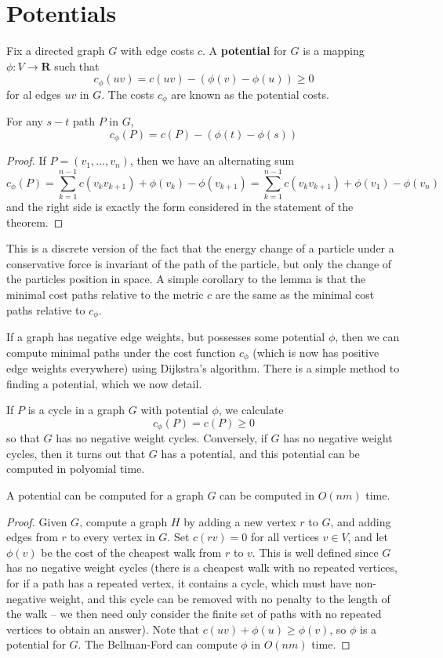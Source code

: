 \section{Potentials}

Fix a directed graph $G$ with edge costs $c$. A {\bf potential} for $G$ is a mapping $\phi: V \to \mathbf{R}$ such that
%
\[ c_\phi(uv) = c(uv) - (\phi(v) - \phi(u)) \geq 0 \]
%
for al edges $uv$ in $G$. The costs $c_\phi$ are known as the potential costs.

\begin{lemma}
    For any $s-t$ path $P$ in $G$,
    \[ c_\phi(P) = c(P) - (\phi(t) - \phi(s)) \]
\end{lemma}
\begin{proof}
    If $P = (v_1, \dots, v_n)$, then we have an alternating sum
    \[ c_\phi(P) = \sum_{k = 1}^{n-1} c(v_k v_{k+1}) + \phi(v_k) - \phi(v_{k+1}) = \sum_{k = 1}^{n-1} c(v_k v_{k+1}) + \phi(v_1) - \phi(v_n) \]
    and the right side is exactly the form considered in the statement of the theorem.
\end{proof}

This is a discrete version of the fact that the energy change of a particle under a conservative force is invariant of the path of the particle, but only the change of the particles position in space. A simple corollary to the lemma is that the minimal cost paths relative to the metric $c$ are the same as the minimal cost paths relative to $c_\phi$.

If a graph has negative edge weights, but possesses some potential $\phi$, then we can compute minimal paths under the cost function $c_\phi$ (which is now has positive edge weights everywhere) using Dijkstra's algorithm. There is a simple method to finding a potential, which we now detail.

If $P$ is a cycle in a graph $G$ with potential $\phi$, we calculate
%
\[ c_\phi(P) = c(P) \geq 0 \]
%
so that $G$ has no negative weight cycles. Conversely, if $G$ has no negative weight cycles, then it turns out that $G$ has a potential, and this potential can be computed in polyomial time.

\begin{theorem}
    A potential can be computed for a graph $G$ can be computed in $O(nm)$ time.
\end{theorem}
\begin{proof}
    Given $G$, compute a graph $H$ by adding a new vertex $r$ to $G$, and adding edges from $r$ to every vertex in $G$. Set $c(rv) = 0$ for all vertices $v \in V$, and let $\phi(v)$ be the cost of the cheapest walk from $r$ to $v$. This is well defined since $G$ has no negative weight cycles (there is a cheapest walk with no repeated vertices, for if a path has a repeated vertex, it contains a cycle, which must have non-negative weight, and this cycle can be removed with no penalty to the length of the walk -- we then need only consider the finite set of paths with no repeated vertices to obtain an answer). Note that $c(uv) + \phi(u) \geq \phi(v)$, so $\phi$ is a potential for $G$. The Bellman-Ford can compute $\phi$ in $O(nm)$ time.
\end{proof}

